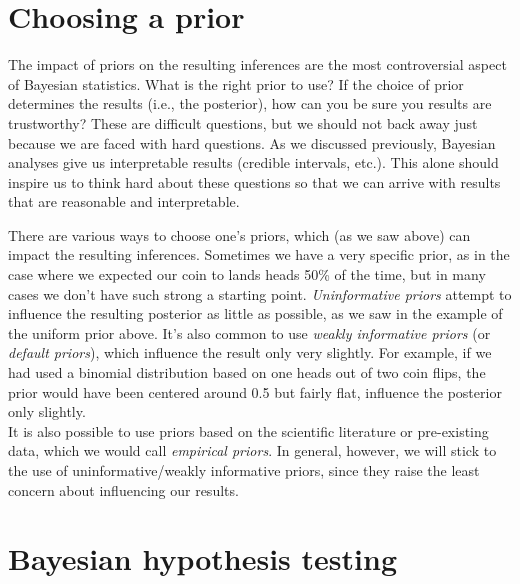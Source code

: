 \documentclass[12pt,]{book}
\theoremstyle{definition}
\theoremstyle{definition}
\theoremstyle{definition}
\theoremstyle{remark}
\begin{document}
\hypertarget{choosing-a-prior}{%
\section{Choosing a prior}\label{choosing-a-prior}}

The impact of priors on the resulting inferences are the most controversial aspect of Bayesian statistics. What is the right prior to use? If the choice of prior determines the results (i.e., the posterior), how can you be sure you results are trustworthy? These are difficult questions, but we should not back away just because we are faced with hard questions. As we discussed previously, Bayesian analyses give us interpretable results (credible intervals, etc.). This alone should inspire us to think hard about these questions so that we can arrive with results that are reasonable and interpretable.

There are various ways to choose one's priors, which (as we saw above) can impact the resulting inferences. Sometimes we have a very specific prior, as in the case where we expected our coin to lands heads 50\% of the time, but in many cases we don't have such strong a starting point. \emph{Uninformative priors} attempt to influence the resulting posterior as little as possible, as we saw in the example of the uniform prior above. It's also common to use \emph{weakly informative priors} (or \emph{default priors}), which influence the result only very slightly. For example, if we had used a binomial distribution based on one heads out of two coin flips, the prior would have been centered around 0.5 but fairly flat, influence the posterior only slightly.\\
It is also possible to use priors based on the scientific literature or pre-existing data, which we would call \emph{empirical priors}. In general, however, we will stick to the use of uninformative/weakly informative priors, since they raise the least concern about influencing our results.

\hypertarget{bayesian-hypothesis-testing}{%
\section{Bayesian hypothesis testing}\label{bayesian-hypothesis-testing}}
\end{document}
